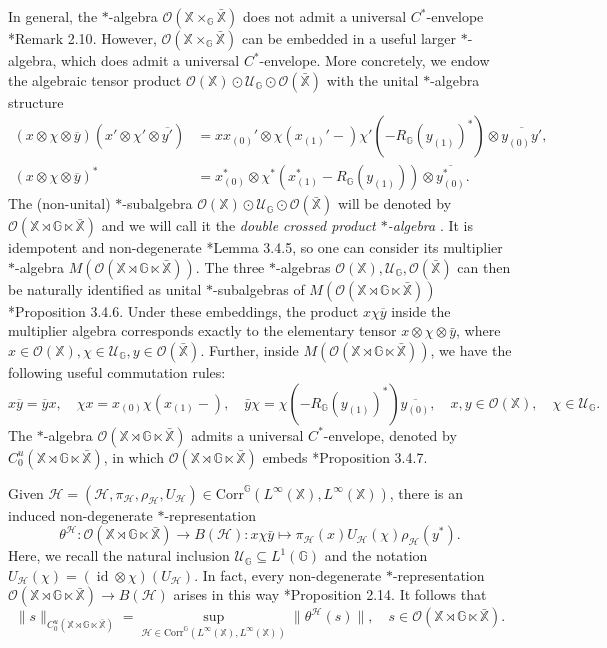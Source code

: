 \documentclass[reqno]{amsart}
\numberwithin{equation}{section}
\newcommand\XGX{\X\times_\G \bar{\X}}
\newcommand\XrX{\X\rtimes\G \ltimes\bar{\X}}
\DeclareMathOperator{\id}{\mathrm{id}}
\newcommand{\mcH}{\mathcal{H}}
\newcommand{\mcO}{\mathcal{O}}
\newcommand{\G}{\mathbb{G}}
\newcommand{\X}{\mathbb{X}}
\newcommand{\Corr}{\mathrm{Corr}}
\begin{document}
In general, the $*$-algebra $\mcO(\XGX)$ does not admit a universal $C^*$-envelope \cite{DCDR25}*{Remark 2.10}. However, $\mcO(\XGX)$ can be embedded in a useful larger $*$-algebra, which does admit a universal $C^*$-envelope. More concretely, we endow the algebraic tensor product $\mcO(\X)\odot \mathscr{U}_\G\odot \mcO(\bar{\X})$ with the unital $*$-algebra structure
\begin{align*}
    (x\otimes \chi \otimes \overline{y})(x'\otimes \chi'\otimes \overline{y'}) &= xx_{(0)}' \otimes \chi(x_{(1)}'-)\chi'(-R_\G(y_{(1)})^*) \otimes \overline{y_{(0)}y'},\\
    (x\otimes \chi \otimes \overline{y})^* &= x_{(0)}^* \otimes \chi^*(x_{(1)}^* - R_\G(y_{(1)})) \otimes \overline{y_{(0)}^*}.
\end{align*}
The (non-unital) $*$-subalgebra $\mcO(\X)\odot \mathcal{U}_\G \odot \mcO(\bar{\X})$ will be denoted by $\mcO(\XrX)$ and we will call it the \emph{double crossed product $*$-algebra} \cites{AS21,DCDR25}. It is idempotent and non-degenerate \cite{DR25d}*{Lemma 3.4.5}, so one can consider its multiplier $*$-algebra $M(\mcO(\XrX))$. The three $*$-algebras $\mcO(\X), \mathscr{U}_\G, \mcO(\bar{\X})$ can then be naturally identified as unital $*$-subalgebras of $M(\mcO(\XrX))$ \cite{DR25d}*{Proposition 3.4.6}. Under these embeddings, the product $x\chi\overline{y}$ inside the multiplier algebra corresponds exactly to the elementary tensor $x\otimes \chi \otimes \bar{y}$, where $x\in \mcO(\X), \chi\in \mathcal{U}_\G, y \in \mcO(\bar{\X})$. Further, inside $M(\mcO(\XrX))$, we have the following useful commutation rules:
$$x\overline{y}= \overline{y}x, \quad \chi x = x_{(0)}\chi(x_{(1)}-), \quad \bar{y}\chi = \chi(-R_\G(y_{(1)})^*)\overline{y_{(0)}}, \quad x,y \in \mcO(\X), \quad \chi\in \mathscr{U}_\G.$$
The $*$-algebra $\mcO(\X\rtimes \G \ltimes \bar{\X})$ admits a universal $C^*$-envelope, denoted by $C^u_0(\XrX)$, in which $\mcO(\XrX)$ embeds \cite{DR25d}*{Proposition 3.4.7}.

Given $\mcH=(\mcH, \pi_\mcH, \rho_\mcH, U_\mcH) \in \Corr^\G(L^\infty(\X), L^\infty(\X))$, there is an induced non-degenerate $*$-representation
$$\theta^\mcH: \mcO(\XrX)\to B(\mcH): x\chi\bar{y}\mapsto \pi_\mcH(x)U_\mcH(\chi)\rho_\mcH(y^*).$$
Here, we recall the natural inclusion $\mathcal{U}_\G\subseteq L^1(\G)$ and the notation $U_\mcH(\chi) = (\id \otimes \chi)(U_\mcH)$.
In fact, every non-degenerate $*$-representation $\mcO(\XrX)\to B(\mcH)$ arises in this way \cite{DCDR25}*{Proposition 2.14}. It follows that
\begin{equation}\label{universalnormcrossed}
    \|s\|_{C^u_0(\XrX)}= \sup_{\mcH\in \Corr^\G(L^\infty(\X), L^\infty(\X))} \|\theta^\mcH(s)\|, \quad s\in \mcO(\XrX).
\end{equation}
\end{document}
